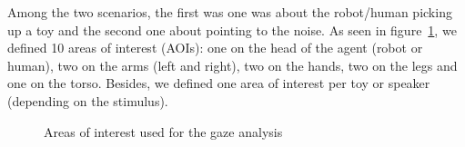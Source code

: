 \documentclass[lettersize, noapacite, twoside, HRI]{apa_HRI}
\begin{document}
Among the two scenarios, the first was one was about the robot/human picking up
a toy and the second one about pointing to the noise. As seen in
figure~\ref{fig:aoi}, we defined 10 areas of interest (AOIs): one on the head of
the agent (robot or human), two on the arms (left and right), two on the hands,
two on the legs and one on the torso. Besides, we defined one area of interest
per toy or speaker (depending on the stimulus).

\begin{figure}
    \centering


    \caption{Areas of interest used for the gaze analysis}
    \label{fig:aoi}
\end{figure}
\end{document}
